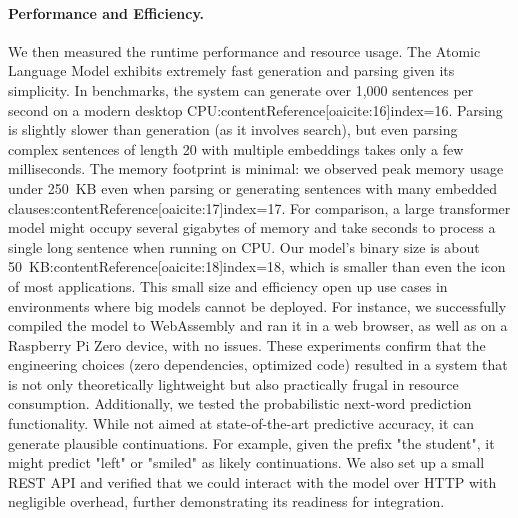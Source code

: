 \documentclass[11pt]{article}
\begin{document}
\paragraph{Performance and Efficiency.} We then measured the runtime performance and resource usage. The Atomic Language Model exhibits extremely fast generation and parsing given its simplicity. In benchmarks, the system can generate over 1,000 sentences per second on a modern desktop CPU:contentReference[oaicite:16]{index=16}. Parsing is slightly slower than generation (as it involves search), but even parsing complex sentences of length 20 with multiple embeddings takes only a few milliseconds. The memory footprint is minimal: we observed peak memory usage under 250~KB even when parsing or generating sentences with many embedded clauses:contentReference[oaicite:17]{index=17}. For comparison, a large transformer model might occupy several gigabytes of memory and take seconds to process a single long sentence when running on CPU. Our model's binary size is about 50~KB:contentReference[oaicite:18]{index=18}, which is smaller than even the icon of most applications. This small size and efficiency open up use cases in environments where big models cannot be deployed. For instance, we successfully compiled the model to WebAssembly and ran it in a web browser, as well as on a Raspberry Pi Zero device, with no issues. These experiments confirm that the engineering choices (zero dependencies, optimized code) resulted in a system that is not only theoretically lightweight but also practically frugal in resource consumption. Additionally, we tested the probabilistic next-word prediction functionality. While not aimed at state-of-the-art predictive accuracy, it can generate plausible continuations. For example, given the prefix "the student", it might predict "left" or "smiled" as likely continuations. We also set up a small REST API and verified that we could interact with the model over HTTP with negligible overhead, further demonstrating its readiness for integration.
\end{document}

